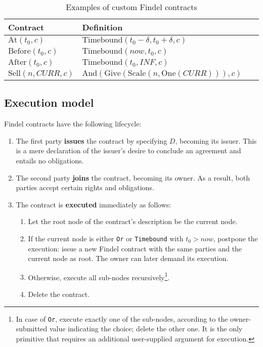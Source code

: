 \begin{table}%
	\centering
	\begin{tabular}{|p{0.25\linewidth}|p{0.75\linewidth}|}
		\hline
		\textbf{Contract} & \textbf{Definition} \\
		\hline
		\(\mathrm{At}(t_0, c)\) & \(\mathrm{Timebound}(t_0 - \delta, t_0 + \delta, c)\) \\
		\hline
		\(\mathrm{Before}(t_0, c)\) & \(\mathrm{Timebound}(now, t_0, c)\) \\
		\hline
		\(\mathrm{After}(t_0, c)\) & \(\mathrm{Timebound}(t_0, INF, c)\) \\
		\hline
		\(\mathrm{Sell}(n, CURR, c)\) & \(\mathrm{And}(\mathrm{Give}(\mathrm{Scale}(n,\mathrm{One}(CURR))),c)\) \\
		\hline
	\end{tabular}
	\caption{Examples of custom Findel contracts}
	\label{tab:Ch10_Findel_Composability}
\end{table}



\subsection{Execution model} \label{sec:Ch10_Findel_ExecutionModel}

Findel contracts have the following lifecycle:

\begin{enumerate}
	\item The first party \textbf{issues} the contract by specifying $D$, becoming its issuer. This is a mere declaration of the issuer's desire to conclude an agreement and entails no obligations.
	\item The second party \textbf{joins} the contract, becoming its owner. As a result, both parties accept certain rights and obligations.
	\item The contract is \textbf{executed} immediately as follows:
	\begin{enumerate}
		\item Let the root node of the contract's description be the current node.
		\item If the current node is either \texttt{Or} or \texttt{Timebound} with $t_0 > now$, postpone the execution: issue a new Findel contract with the same parties and the current node as root. The owner can later demand its execution.
		\item Otherwise, execute all sub-nodes recursively\footnote{In case of \texttt{Or}, execute exactly one of the sub-nodes, according to the owner-submitted value indicating the choice; delete the other one. It is the only primitive that requires an additional user-supplied argument for execution.}.
		\item Delete the contract.
	\end{enumerate}
\end{enumerate}

